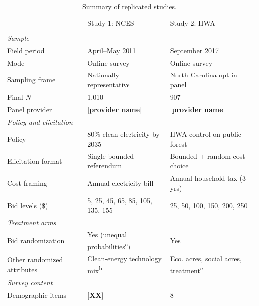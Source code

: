 \documentclass[12pt]{article}
\begin{document}
\begin{table}[h]
    \centering
    \caption{Summary of replicated studies.}
    \label{tab:data-summary}
    \begin{threeparttable}
    \footnotesize
    \begin{tabular}{lll}
        \toprule
         & Study 1: NCES & Study 2: HWA \\
         & \textcite{Aldy2012} & \textcite{Giguere2020} \\
        \midrule
        \multicolumn{3}{l}{\textit{Sample}} \\
        Field period                       & April--May 2011                & September 2017 \\
        Mode                               & Online survey                  & Online survey \\
        Sampling frame                     & Nationally representative      & North Carolina opt-in panel \\
        Final $N$                          & 1{,}010                        & 907 \\
        Panel provider                     & [\textbf{provider name}]       & [\textbf{provider name}] \\
        \midrule
        \multicolumn{3}{l}{\textit{Policy and elicitation}} \\
        Policy                             & 80\% clean electricity by 2035 & HWA control on public forest \\
        Elicitation format                 & Single-bounded referendum      & Bounded + random-cost choice \\
        Cost framing                       & Annual electricity bill        & Annual household tax (3 yrs) \\
        Bid levels (\$)                    & 5, 25, 45, 65, 85, 105, 135, 155 & 25, 50, 100, 150, 200, 250 \\
        \midrule
        \multicolumn{3}{l}{\textit{Treatment arms}} \\
        Bid randomization                  & Yes (unequal probabilities\textsuperscript{a}) & Yes \\
        Other randomized attributes        & Clean-energy technology mix\textsuperscript{b}    & Eco. acres, social acres, treatment\textsuperscript{c} \\
        \midrule
        \multicolumn{3}{l}{\textit{Survey content}} \\
        Demographic items                  & [\textbf{XX}]                  & 8 \\

\end{tabular}
\end{threeparttable}
\end{table}
\end{document}
